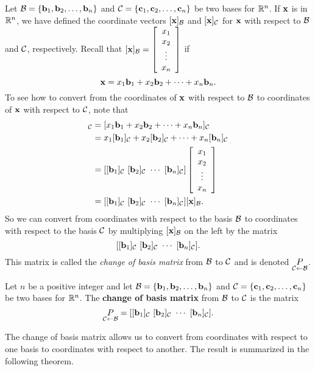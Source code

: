 Let $\mathcal{B} = \{\mathbf{b}_1, \mathbf{b}_2, \ldots, \mathbf{b}_n\}$ and $\mathcal{C} = \{\mathbf{c}_1, \mathbf{c}_2, \ldots, \mathbf{c}_n\}$ be two bases for $\mathbb{R}^n$. If $\mathbf{x}$ is in $\mathbb{R}^n$, we have defined the coordinate vectors $[\mathbf{x}]_{\mathcal{B}}$ and $[\mathbf{x}]_{\mathcal{C}}$ for $\mathbf{x}$ with respect to $\mathcal{B}$ and $\mathcal{C}$, respectively. Recall that $[\mathbf{x}]_{\mathcal{B}} = \left[ \begin{array}{c} x_1 \\ x_2 \\ \vdots \\ x_n \end{array} \right]$ if
\[\mathbf{x} = x_1 \mathbf{b}_1 + x_2 \mathbf{b}_2 + \cdots + x_n \mathbf{b}_n.\]
To see how to convert from the coordinates of $\mathbf{x}$ with respect to $\mathcal{B}$ to coordinates of $\mathbf{x}$ with respect to $\mathcal{C}$, note that
\begin{align*}
[\vx]_{\CC} &= [x_1 \vb_1 + x_2 \vb_2 + \cdots + x_n \vb_n]_{\CC} \\
    &= x_1 [\vb_1]_{\CC} + x_2 [\vb_2]_{\CC} + \cdots + x_n [\vb_n]_{\CC} \\
    &= [[\vb_1]_{\CC} \ [\vb_2]_{\CC}  \  \cdots  \ [\vb_n]_{\CC}]\left[ \begin{array}{c} x_1 \\ x_2 \\ \vdots \\ x_n \end{array} \right] \\
    &= [[\vb_1]_{\CC} \ [\vb_2]_{\CC}  \  \cdots  \ [\vb_n]_{\CC}][\vx]_{\CB}.
\end{align*}
So we can convert from coordinates with respect to the basis $\mathcal{B}$ to coordinates with respect to the basis $\mathcal{C}$ by multiplying $[\mathbf{x}]_{\mathcal{B}}$ on the left by the matrix \[[[\vb_1]_{\CC} \ [\vb_2]_{\CC}  \  \cdots  \ [\vb_n]_{\CC}].\]
This matrix is called the \emph{change of basis matrix} from $\mathcal{B}$ to $\mathcal{C}$ and is denoted $\underset{\mathcal{C} \leftarrow \mathcal{B}}{P}$.

\begin{definition} Let $n$ be a positive integer and let $\mathcal{B} = \{\mathbf{b}_1, \mathbf{b}_2, \ldots, \mathbf{b}_n\}$ and $\mathcal{C} = \{\mathbf{c}_1, \mathbf{c}_2, \ldots, \mathbf{c}_n\}$ be two bases for $\mathbb{R}^n$. The \textbf{change of basis matrix} from $\mathcal{B}$ to $\mathcal{C}$ is the matrix 
\[\underset{\mathcal{C} \leftarrow \mathcal{B}}{P} = [[\mathbf{b}_1]_{\mathcal{C}} \ [\mathbf{b}_2]_{\mathcal{C}}  \  \cdots  \ [\mathbf{b}_n]_{\mathcal{C}}].\]
\end{definition}

The change of basis matrix allows us to convert from coordinates with respect to one basis to coordinates with respect to another. The result is summarized in the following theorem.


